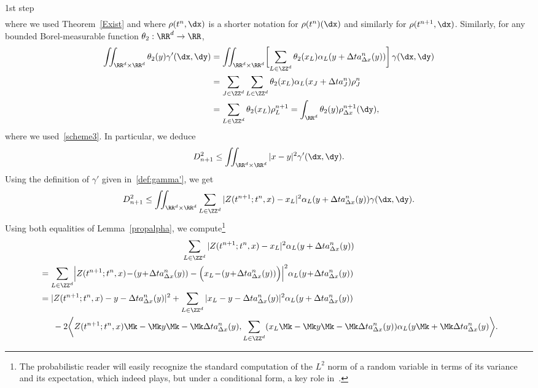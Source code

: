 \begin{step}{1st step}
\begin{align*}
\end{align*}
where we used Theorem~\ref{Exist} and where $\rho(t^n,\dx)$ is a shorter notation for $\rho(t^n)(\dx)$ and similarly for $\rho(t^{n+1},\dx)$. Similarly, for any bounded Borel-measurable function $\theta_{2} : \RR^d \rightarrow \RR$,
\begin{align*}
\iint_{\RR^d\times\RR^d} \theta_{2}(y) \gamma'(\dx,\dy) & = \iint_{\RR^d\times\RR^d}
\biggl[\sum_{L\in \ZZ^d} \theta_{2}(x_L) \alpha_L(y+\Delta t a^n_{\Delta x}(y))\biggr]\,\gamma(\dx,\dy) \\
& = \sum_{J\in \ZZ^d}\sum_{L\in \ZZ^d} \theta_{2}(x_L) \alpha_L(x_J+\Delta t a_J^n) \rho_J^n \\
& = \sum_{L\in \ZZ^d} \theta_{2}(x_L) \rho_L^{n+1} = \int_{\RR^d} \theta_{2}(y) \rho^{n+1}_{\Delta x}(\dy),
\end{align*}
where we used~\eqref{scheme3}. In particular, we deduce
\[
D_{n+1}^2 \leq \iint_{\RR^d\times\RR^d} |x-y|^2 \gamma'(\dx,\dy).
\]
Using the definition of $\gamma'$ given in~\eqref{def:gamma'}, we get
\begin{equation}\label{eq1}
D_{n+1}^2 \leq \iint_{\RR^d\times\RR^d} \sum_{L\in \ZZ^d} |Z(t^{n+1};t^n,x)-x_L|^2 \alpha_L (y+\Delta t a^n_{\Delta x}(y)) \gamma(\dx,\dy).
\end{equation}
Using both equalities of Lemma~\ref{propalpha}, we compute\footnote{The probabilistic reader will easily recognize the standard computation of the $L^2$ norm of a random variable in terms of its variance and its expectation, which indeed plays, but under a conditional form, a key role in~\cite{DLV}.}
\begin{multline}\label{eqZz}
\sum_{L\in \ZZ^d}|Z(t^{n+1};t^n,x) - x_L|^2 \alpha_L(y+\Delta t a^n_{\Delta x}(y)) \\
\begin{aligned}
&= \sum_{L\in \ZZ^d}\Bigl| Z(t^{n+1};t^n,x) \!-\! (y \!+\!\Delta t a^n_{\Delta x}(y)) - \Bigl(x_L \!-\! (y \!+\! \Delta t a^n_{\Delta x}(y)) \Bigr) \Bigr|^2 \alpha_L(y\!+\!\Delta t a^n_{\Delta x}(y)) \\
&= |Z(t^{n+1};t^n,x) - y - \Delta t a^n_{\Delta x}(y) |^2 + \sum_{L\in \ZZ^d} |x_L - y - \Delta t a^n_{\Delta x}(y)|^2 \alpha_L(y+\Delta t a^n_{\Delta x}(y)) \\
&\;\;\quad -2\biggl\langle Z(t^{n+1};t^n,x) \Mk-\Mk y \Mk-\Mk \Delta t a^n_{\Delta x}(y),\sum_{L \in \ZZ^d}
(x_L\Mk-\Mk y\Mk-\Mk\Delta t a^n_{\Delta x}(y)) \alpha_L(y\Mk+\Mk\Delta t a^n_{\Delta x}(y)\biggr\rangle.
\end{aligned}
\end{multline}

\end{step}

